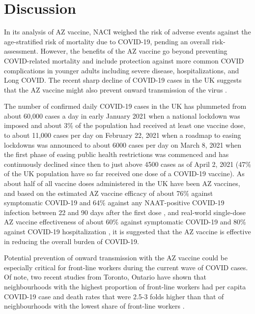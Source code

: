\documentclass[]{interact}
\theoremstyle{plain}%
\theoremstyle{definition}
\theoremstyle{remark}
\begin{document}
\hypertarget{discussion}{%
\section{Discussion}\label{discussion}}

In its analysis of AZ vaccine, NACI weighed the risk of adverse events
against the age-stratified risk of mortality due to COVID-19, pending an
overall risk-assessment. However, the benefits of the AZ vaccine go
beyond preventing COVID-related mortality and include protection against
more common COVID complications in younger adults including severe
disease, hospitalizations, and Long COVID. The recent sharp decline of
COVID-19 cases in the UK suggests that the AZ vaccine might also prevent
onward transmission of the virus
\citep{our_world_in_data_covid-19_2021}.

The number of confirmed daily COVID-19 cases in the UK has plummeted
from about 60,000 cases a day in early January 2021 when a national
lockdown was imposed and about 3\% of the population had received at
least one vaccine dose, to about 11,000 cases per day on February 22,
2021 when a roadmap to easing lockdowns was announced to about 6000
cases per day on March 8, 2021 when the first phase of easing public
health restrictions was commenced \citep{bbc_lockdown_2021} and has
continuously declined since then to just above 4500 cases as of April 2,
2021 (47\% of the UK population have so far received one dose of a
COVID-19 vaccine). As about half of all vaccine doses administered in
the UK have been AZ vaccines, and based on the estimated AZ vaccine
efficacy of about 76\% against symptomatic COVID-19 and 64\% against any
NAAT-positive COVID-19 infection between 22 and 90 days after the first
dose \citep{voysey_single-dose_2021}, and real-world single-dose AZ
vaccine effectiveness of about 60\% against symptomatic COVID-19 and
80\% against COVID-19 hospitalization
\citep{public_health_england_1public_2021}, it is suggested that the AZ
vaccine is effective in reducing the overall burden of COVID-19.

Potential prevention of onward transmission with the AZ vaccine could be
especially critical for front-line workers during the current wave of
COVID cases. Of note, two recent studies from Toronto, Ontario have
shown that neighbourhoods with the highest proportion of front-line
workers had per capita COVID-19 case and death rates that were 2.5-3
folds higher than that of neighbourhoods with the lowest share of
front-line workers
\citep[\citet{rao_disproportionate_2021}]{chagla_characterizing_2021}.
\end{document}
